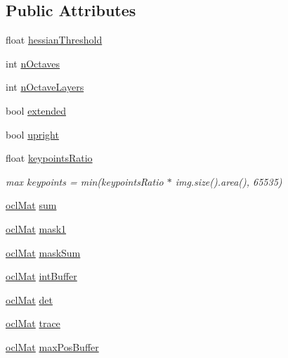 \subsection*{Public Attributes}
\begin{DoxyCompactItemize}
\item 
float \hyperlink{classcv_1_1ocl_1_1SURF__OCL_aae1213f3be9a95a42dbcc0df047b8c00}{hessian\-Threshold}
\item 
int \hyperlink{classcv_1_1ocl_1_1SURF__OCL_a406c2ed99157de3203506c175726c773}{n\-Octaves}
\item 
int \hyperlink{classcv_1_1ocl_1_1SURF__OCL_a379bc4a32533ce4aa78f85e210667deb}{n\-Octave\-Layers}
\item 
bool \hyperlink{classcv_1_1ocl_1_1SURF__OCL_a80d15ad07a11261a87fcc57a5ae1a183}{extended}
\item 
bool \hyperlink{classcv_1_1ocl_1_1SURF__OCL_aa2d233892c230bb56c2016b69cb6d492}{upright}
\item 
float \hyperlink{classcv_1_1ocl_1_1SURF__OCL_a477c4b356f862ae981b4f1421ba47410}{keypoints\-Ratio}
\begin{DoxyCompactList}\small\item\em max keypoints = min(keypoints\-Ratio $\ast$ img.\-size().area(), 65535) \end{DoxyCompactList}\item 
\hyperlink{classcv_1_1ocl_1_1oclMat}{ocl\-Mat} \hyperlink{classcv_1_1ocl_1_1SURF__OCL_a2e5e88a6e1f212ff74b78cfe9842993b}{sum}
\item 
\hyperlink{classcv_1_1ocl_1_1oclMat}{ocl\-Mat} \hyperlink{classcv_1_1ocl_1_1SURF__OCL_ab09f464a0c1e59bfe6979b979272b45e}{mask1}
\item 
\hyperlink{classcv_1_1ocl_1_1oclMat}{ocl\-Mat} \hyperlink{classcv_1_1ocl_1_1SURF__OCL_adb29df077bd0226bb887889f3f5389fc}{mask\-Sum}
\item 
\hyperlink{classcv_1_1ocl_1_1oclMat}{ocl\-Mat} \hyperlink{classcv_1_1ocl_1_1SURF__OCL_ae00b2e62267a2a189d0dda909b41dfda}{int\-Buffer}
\item 
\hyperlink{classcv_1_1ocl_1_1oclMat}{ocl\-Mat} \hyperlink{classcv_1_1ocl_1_1SURF__OCL_a1f4ebd553574b5add58fe75539e29502}{det}
\item 
\hyperlink{classcv_1_1ocl_1_1oclMat}{ocl\-Mat} \hyperlink{classcv_1_1ocl_1_1SURF__OCL_aef0a9250881cbf6ac305bb7da974a1e7}{trace}
\item 
\hyperlink{classcv_1_1ocl_1_1oclMat}{ocl\-Mat} \hyperlink{classcv_1_1ocl_1_1SURF__OCL_a611eab9482f991153407968cdfcc3873}{max\-Pos\-Buffer}
\end{DoxyCompactItemize}


